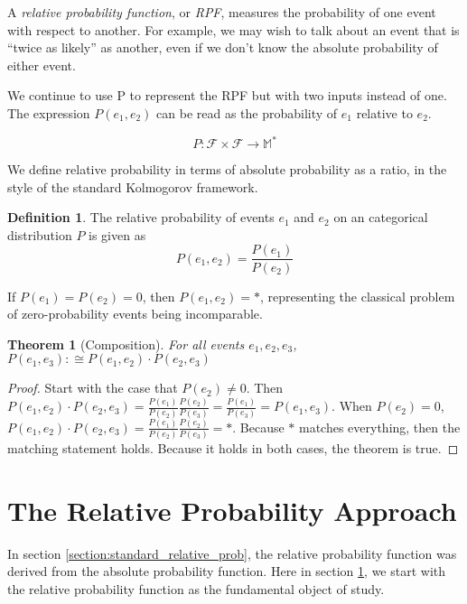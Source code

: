 \documentclass[twoside]{article}
\newcommand{\quotes}[1]{``#1''}
\theoremstyle{plain}%
\newtheorem{theorem}{Theorem}[section]
\theoremstyle{definition}
\newtheorem{definition}{Definition}[section]
\theoremstyle{remark}
\begin{document}
A \textit{relative probability function}, or \textit{RPF}, measures the probability of one event with respect to another. For example, we may wish to talk about an event that is \quotes{twice as likely} as another, even if we don't know the absolute probability of either event.

We continue to use P to represent the RPF but with two inputs instead of one. The expression \(P(e_1, e_2)\) can be read as the probability of \(e_1\) relative to \(e_2\).

\[P: \mathcal{F} \times \mathcal{F} \rightarrow \mathbb{M}^*\]

We define relative probability in terms of absolute probability as a ratio, in the style of the standard Kolmogorov framework.

\begin{definition}
\label{def:ratio}
The relative probability of events \(e_1\) and \(e_2\) on an categorical distribution \(P\) is given as
\[P(e_1, e_2) = \frac{P(e_1)}{P(e_2)}\]
\end{definition}

If \(P(e_1) = P(e_2) = 0\), then \(P(e_1, e_2) = \ast\), representing the classical problem of zero-probability events being incomparable.

\begin{theorem}[Composition]
For all events \(e_1, e_2, e_3\), \(P(e_1, e_3) :\cong P(e_1, e_2) \cdot P(e_2, e_3)\)
\end{theorem}

\begin{proof}
Start with the case that \(P(e_2)\neq 0\). Then \(P(e_1, e_2) \cdot P(e_2, e_3) = \frac{P(e_1)}{P(e_2)}\frac{P(e_2)}{P(e_3)} = \frac{P(e_1)}{P(e_3)} = P(e_1, e_3)\). When \(P(e_2) = 0\), \(P(e_1, e_2) \cdot P(e_2, e_3) = \frac{P(e_1)}{P(e_2)}\frac{P(e_2)}{P(e_3)} = \ast\). Because \(\ast\) matches everything, then the matching statement holds. Because it holds in both cases, the theorem is true.
\end{proof}

\section{The Relative Probability Approach}
\label{section:new_relative_prob}

In section \ref{section:standard_relative_prob}, the relative probability function was derived from the absolute probability function. Here in section \ref{section:new_relative_prob}, we start with the relative probability function as the fundamental object of study.
\end{document}
